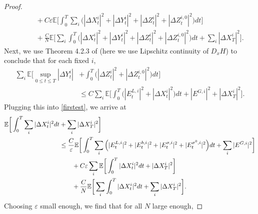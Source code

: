 \documentclass[11pt,reqno]{amsart}
\numberwithin{equation}{section}
\theoremstyle{definition}
\def\E{{\mathbb E}}
\newcommand{\bX}{\mathbf{X}}
\newcommand{\ov}{\overline}
\def \E{\mathbb{E}}
\begin{document}
\begin{proof}
\begin{align}
& \qquad + C \varepsilon \E\bigg[\int_0^T \sum_i \Big( |\Delta X_t^i|^2 + |\Delta Y_t^i|^2 + |\Delta Z_t^i|^2 + |\Delta Z_t^{i,0}|^2 \Big) dt \bigg] \nonumber \\
& \qquad  + \frac{C}{N} \E\bigg[\sum_i \int_0^T \Big( |\Delta X_t^i|^2 + |\Delta Y_t^i|^2 + |\Delta Z_t^i|^2 + |\Delta Z_t^{i,0}|^2 \Big) dt + \sum_i |\Delta X_T^i|^2 \bigg].
\end{align} 
Next, we use Theorem 4.2.3 of \cite{Zhang} (here we use Lipschitz continuity of $D_x H$) to conclude that for each fixed $i$, 
\begin{align} \label{bsdestab}
\sum_i \E\bigg[\sup_{0 \leq t \leq T} |\Delta Y_t^i| &+ \int_0^T 
\Big(|\Delta Z_t^i|^2 + |\Delta Z_t^{i,0}|^2 \Big) dt \bigg] \nonumber \\
 &\leq C \sum_i \E \bigg[ \int_0^T \Big( |E_t^{L,i}|^2 + |\Delta X_t^i|^2 \Big) dt +   |E^{G,i}|^2 + |\Delta X_T^i|^2 \bigg].
\end{align}
Plugging this into \eqref{firstest}, we arrive at 
\begin{align} \notag
  \E\bigg[\int_0^T \sum_i |\Delta X_t^i|^2 dt &+ \sum_i |\Delta X_T^i|^2 \bigg] \\\notag
  &\leq \frac{C}{\varepsilon} \E \bigg[ \int_0^T  \sum_i \Big(|E_t^{L,i}|^2 + |E_t^{b,i}|^2 + |E_t^{\sigma,i}|^2 + |E^{\sigma^0,i}_t|^2 \Big) dt +  \sum_i |E^{G,i}|^2 \bigg]   \\\label{secondest}
  & \qquad + C \varepsilon \sum_i \E\bigg[\int_0^T |\Delta X_t^i|^2 dt + |\Delta X_T^i|^2 \bigg] \nonumber  \\
& \qquad  + \frac{C}{N} \E\bigg[\sum_i \int_0^T |\Delta X_t^i|^2  dt + \sum_i |\Delta X_T^i|^2 \bigg].
\end{align} 
Choosing $\varepsilon$ small enough, we find that for all $N$ large enough, 

\end{proof}
\end{document}
